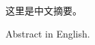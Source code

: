 \begin{cabstract}
    这里是中文摘要。
\end{cabstract}


\begin{eabstract}
    Abstract in English.
\end{eabstract}


